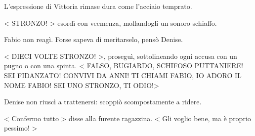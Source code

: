 L'espressione di Vittoria rimase dura come l'acciaio temprato.

< STRONZO! > esordì con veemenza, mollandogli un sonoro schiaffo.

Fabio non reagì. Forse sapeva di meritarselo, pensò Denise.

< DIECI VOLTE STRONZO! >, proseguì, sottolineando ogni accusa con un pugno o con una spinta. < FALSO, BUGIARDO, SCHIFOSO PUTTANIERE! SEI FIDANZATO! CONVIVI DA ANNI! TI CHIAMI FABIO, IO ADORO IL NOME FABIO! SEI UNO STRONZO, TI ODIO!>

Denise non riuscì a trattenersi: scoppiò scompostamente a ridere.

< Confermo tutto > disse alla furente ragazzina. < Gli voglio bene, ma è proprio pessimo! >

